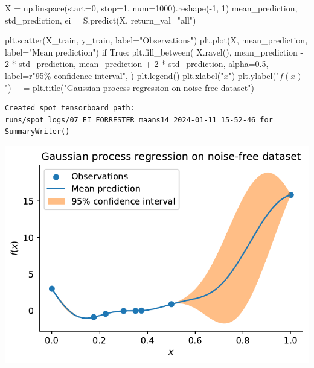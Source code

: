 \documentclass[
  letterpaper,
  DIV=11,
  numbers=noendperiod]{scrreprt}
\newenvironment{Shaded}{\begin{snugshade}}{\end{snugshade}}
\newcommand{\ControlFlowTok}[1]{\textcolor[rgb]{0.00,0.23,0.31}{#1}}
\newcommand{\DecValTok}[1]{\textcolor[rgb]{0.68,0.00,0.00}{#1}}
\newcommand{\FloatTok}[1]{\textcolor[rgb]{0.68,0.00,0.00}{#1}}
\newcommand{\NormalTok}[1]{\textcolor[rgb]{0.00,0.23,0.31}{#1}}
\newcommand{\OperatorTok}[1]{\textcolor[rgb]{0.37,0.37,0.37}{#1}}
\newcommand{\SpecialCharTok}[1]{\textcolor[rgb]{0.37,0.37,0.37}{#1}}
\newcommand{\StringTok}[1]{\textcolor[rgb]{0.13,0.47,0.30}{#1}}
\newcommand{\VariableTok}[1]{\textcolor[rgb]{0.07,0.07,0.07}{#1}}
\newcommand{\VerbatimStringTok}[1]{\textcolor[rgb]{0.13,0.47,0.30}{#1}}
\begin{document}
\begin{Shaded}
\begin{Highlighting}[]
\NormalTok{X }\OperatorTok{=}\NormalTok{ np.linspace(start}\OperatorTok{=}\DecValTok{0}\NormalTok{, stop}\OperatorTok{=}\DecValTok{1}\NormalTok{, num}\OperatorTok{=}\DecValTok{1000}\NormalTok{).reshape(}\OperatorTok{{-}}\DecValTok{1}\NormalTok{, }\DecValTok{1}\NormalTok{)}
\NormalTok{mean\_prediction, std\_prediction, ei }\OperatorTok{=}\NormalTok{ S.predict(X, return\_val}\OperatorTok{=}\StringTok{"all"}\NormalTok{)}

\NormalTok{plt.scatter(X\_train, y\_train, label}\OperatorTok{=}\StringTok{"Observations"}\NormalTok{)}
\NormalTok{plt.plot(X, mean\_prediction, label}\OperatorTok{=}\StringTok{"Mean prediction"}\NormalTok{)}
\ControlFlowTok{if} \VariableTok{True}\NormalTok{:}
\NormalTok{    plt.fill\_between(}
\NormalTok{        X.ravel(),}
\NormalTok{        mean\_prediction }\OperatorTok{{-}} \DecValTok{2} \OperatorTok{*}\NormalTok{ std\_prediction,}
\NormalTok{        mean\_prediction }\OperatorTok{+} \DecValTok{2} \OperatorTok{*}\NormalTok{ std\_prediction,}
\NormalTok{        alpha}\OperatorTok{=}\FloatTok{0.5}\NormalTok{,}
\NormalTok{        label}\OperatorTok{=}\VerbatimStringTok{r"95}\SpecialCharTok{\% c}\VerbatimStringTok{onfidence interval"}\NormalTok{,}
\NormalTok{    )}
\NormalTok{plt.legend()}
\NormalTok{plt.xlabel(}\StringTok{"$x$"}\NormalTok{)}
\NormalTok{plt.ylabel(}\StringTok{"$f(x)$"}\NormalTok{)}
\NormalTok{\_ }\OperatorTok{=}\NormalTok{ plt.title(}\StringTok{"Gaussian process regression on noise{-}free dataset"}\NormalTok{)}
\end{Highlighting}
\end{Shaded}

\begin{verbatim}
Created spot_tensorboard_path: runs/spot_logs/07_EI_FORRESTER_maans14_2024-01-11_15-52-46 for SummaryWriter()
\end{verbatim}

\includegraphics{012_num_spot_ei_files/figure-pdf/cell-47-output-2.pdf}
\end{document}
